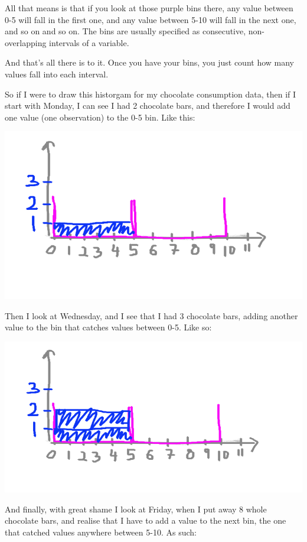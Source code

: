 \documentclass[]{book}
\theoremstyle{definition}
\theoremstyle{definition}
\theoremstyle{definition}
\theoremstyle{remark}
\begin{document}
All that means is that if you look at those purple bins there, any value
between 0-5 will fall in the first one, and any value between 5-10 will
fall in the next one, and so on and so on. The bins are usually
specified as consecutive, non-overlapping intervals of a variable.

And that's all there is to it. Once you have your bins, you just count
how many values fall into each interval.

So if I were to draw this historgam for my chocolate consumption data,
then if I start with Monday, I can see I had 2 chocolate bars, and
therefore I would add one value (one observation) to the 0-5 bin. Like
this:

\includegraphics{imgs/hist_fill_1.png}

Then I look at Wednesday, and I see that I had 3 chocolate bars, adding
another value to the bin that catches values between 0-5. Like so:

\includegraphics{imgs/hist_fill_2.png}

And finally, with great shame I look at Friday, when I put away 8 whole
chocolate bars, and realise that I have to add a value to the next bin,
the one that catched values anywhere between 5-10. As such:
\end{document}
